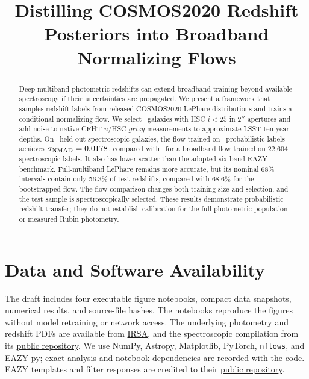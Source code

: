 \documentclass[twocolumn,linenumbers]{aastex63}
\begin{document}
\title{Distilling COSMOS2020 Redshift Posteriors into Broadband Normalizing Flows}


\begin{abstract}
Deep multiband photometric redshifts can extend broadband training beyond
available spectroscopy if their uncertainties are propagated.
We present a framework that samples redshift labels from released
COSMOS2020 LePhare distributions and trains a conditional normalizing flow.
We select \NParent\ galaxies with HSC $i<25$ in $2''$ apertures and add
noise to native CFHT $u$/HSC $grizy$ measurements to approximate LSST
ten-year depths. On \NTest\ held-out spectroscopic galaxies, the flow
trained on \NTrain\ probabilistic labels achieves
$\sigma_{\rm NMAD}=0.0178$, compared with \SpecScatter\ for a broadband
flow trained on 22,604 spectroscopic labels. It also has lower scatter
than the adopted six-band EAZY benchmark. Full-multiband LePhare remains
more accurate, but its nominal 68\% intervals contain only 56.3\% of test
redshifts, compared with 68.6\% for the bootstrapped flow.
The flow comparison changes both training size and selection, and the
test sample is spectroscopically selected. These results demonstrate
probabilistic redshift transfer; they do not establish calibration for
the full photometric population or measured Rubin photometry.
\end{abstract}







\section*{Data and Software Availability}
The draft includes four executable figure notebooks, compact data snapshots,
numerical results, and source-file hashes.
The notebooks reproduce the figures without model retraining or network access.
The underlying photometry and redshift PDFs are available from
\href{https://irsa.ipac.caltech.edu/data/COSMOS/tables/cosmos2020/}{IRSA},
and the spectroscopic compilation from its
\href{https://github.com/cosmosastro/speczcompilation}{public repository}.
We use NumPy, Astropy, Matplotlib, PyTorch, \texttt{nflows}, and
EAZY-py; exact analysis and notebook dependencies are recorded with the code.
EAZY templates and filter responses are credited to their
\href{https://github.com/gbrammer/eazy-photoz}{public repository}.

\clearpage



\end{document}
